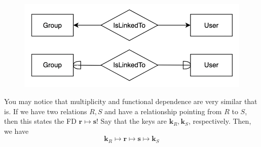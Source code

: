 \begin{definition}
\begin{enumerate}
      \begin{figure}[H]
        \centering 
        \includegraphics[scale=0.3]{img/islinked.png}
        \caption{} 
        \label{fig:islinked}
      \end{figure}
      \end{enumerate}
    \end{definition}

    \begin{theorem}
      You may notice that multiplicity and functional dependence are very similar that is. If we have two relations $R, S$ and have a relationship pointing from $R$ to $S$, then this states the FD $\mathbf{r} \mapsto \mathbf{s}$! Say that the keys are $\mathbf{k}_R, \mathbf{k}_S$, respectively. Then, we have 
      \begin{equation}
        \mathbf{k}_R \mapsto \mathbf{r} \mapsto \mathbf{s} \mapsto \mathbf{k}_S
      \end{equation} 
    \end{theorem}

